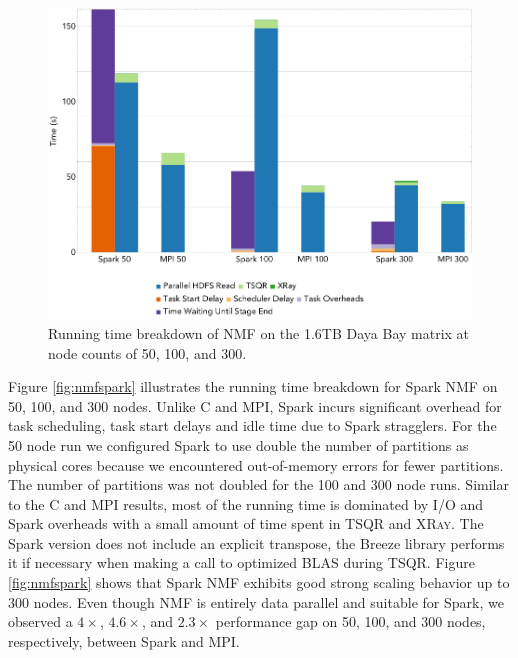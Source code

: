\begin{figure}[th!]
\begin{center}
\includegraphics[width=\textwidth]{fig/nmf_run_times.png}
\caption{Running time breakdown of NMF on the 1.6TB Daya Bay matrix at 
node counts of 50, 100, and 300.}
\label{fig:nmfrt}
\end{center}
\end{figure}

Figure \ref{fig:nmfspark} illustrates the running time breakdown for Spark NMF on 50, 100, and 300 nodes. Unlike C and MPI, Spark incurs significant overhead for task scheduling, task start delays and idle time due to Spark stragglers. For the 50 node run we configured Spark to use double the number of partitions as physical cores because we encountered out-of-memory errors for fewer partitions. The number of partitions was not doubled for the 100 and 300 node runs. Similar to the C and MPI results, most of the running time is dominated by I/O and Spark overheads with a small amount of time spent in TSQR and \textsc{XRay}. The Spark version does not include an explicit transpose, the Breeze library performs it if necessary when making a call to optimized BLAS during TSQR. Figure \ref{fig:nmfspark} shows that Spark NMF exhibits good strong scaling behavior up to 300 nodes.  Even though NMF is entirely data parallel and suitable for Spark, we observed a $4\times$, $4.6\times$, and $2.3\times$ performance gap on 50, 100, and 300 nodes, respectively, between Spark and MPI.

